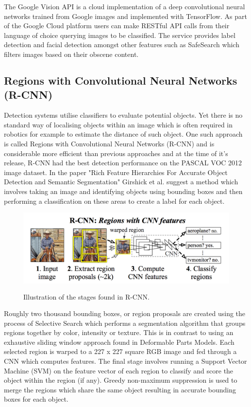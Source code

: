 \documentclass{mproj}
\begin{document}
The Google Vision API is a cloud implementation of a deep convolutional neural networks trained from Google images and implemented with TensorFlow. As part of the Google Cloud platform users can make RESTful API calls from their language of choice querying images to be classified. The service provides label detection and facial detection amongst other features such as SafeSearch which filters images based on their obscene content\cite{googlevision}.

\subsection{Regions with Convolutional Neural Networks (R-CNN)}

Detection systems utilise classifiers to evaluate potential objects. Yet there is no standard way of localising objects within an image which is often required in robotics for example to estimate the distance of such object. One such approach is called Regions with Convolutional Neural Networks (R-CNN) and is considerable more efficient than previous approaches and at the time of it's release, R-CNN had the best detection performance on the PASCAL VOC 2012 image dataset. In the paper "Rich Feature Hierarchies For Accurate Object Detection and Semantic Segmentation"\cite{Girshick2014} Girshick et al. suggest a method which involves taking an image and identifying objects using bounding boxes and then performing a classification on these areas to create a label for each object. 

\begin{figure}[h]
  \caption{Illustration of the stages found in R-CNN.}
  \centering
  \includegraphics[width=1.0\textwidth]{images/RCNN.png}
  \label{fig:RCNN Diagram}
\end{figure}

Roughly two thousand bounding boxes, or region proposals are created using the process of Selective Search which performs a segmentation algorithm that groups regions together by color, intensity or texture.\cite{Sande2013} This is in contrast to using an exhaustive sliding window approach found in Deformable Parts Models.\cite{voc-release4} Each selected region is warped to a 227 x 227 square RGB image and fed through a CNN which computes features. The final stage involves running a Support Vector Machine (SVM) on the feature vector of each region to classify and score the object within the region (if any). Greedy non-maximum suppression is used to merge the regions which share the same object resulting in accurate bounding boxes for each object. 
\end{document}
